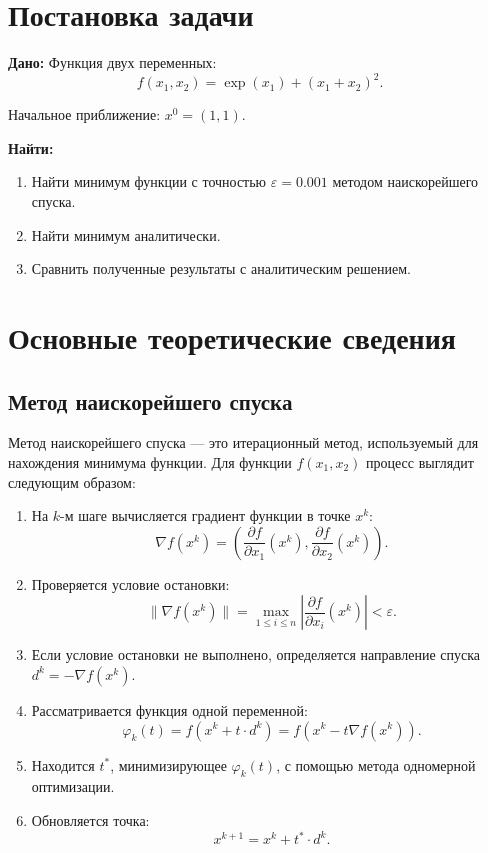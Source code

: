 \documentclass[a4paper, 14pt]{extarticle}
\begin{document}


\renewcommand{\ttdefault}{pcr}

\setlength{\tabcolsep}{3pt}



\newpage
\setcounter{page}{2}


\section{Постановка задачи}

\textbf{Дано:} Функция двух переменных:
\[ f(x_1, x_2) = \exp(x_1) + (x_1 + x_2)^2. \]

Начальное приближение: \( x^0 = (1, 1) \).

\textbf{Найти:}
\begin{enumerate}
    \item Найти минимум функции с точностью \( \varepsilon = 0.001 \) методом наискорейшего спуска.
    \item Найти минимум аналитически.
    \item Сравнить полученные результаты с аналитическим решением.
\end{enumerate}

\section{Основные теоретические сведения}

\subsection{Метод наискорейшего спуска}

Метод наискорейшего спуска — это итерационный метод, используемый для нахождения минимума функции. 
Для функции \( f(x_1, x_2) \) процесс выглядит следующим образом:

\begin{enumerate}
    \item На \( k \)-м шаге вычисляется градиент функции в точке \( x^k \):
    \[
    \nabla f(x^k) = \left( \frac{\partial f}{\partial x_1}(x^k), \frac{\partial f}{\partial x_2}(x^k) \right).
    \]
    \item Проверяется условие остановки:
    \[
    \|\nabla f(x^k)\| = \max_{1 \leq i \leq n} \left| \frac{\partial f}{\partial x_i}(x^k) \right| < \varepsilon.
    \]
    \item Если условие остановки не выполнено, определяется направление спуска \( d^k = -\nabla f(x^k) \).
    \item Рассматривается функция одной переменной:
    \[
    \varphi_k(t) = f(x^k + t \cdot d^k) = f(x^k - t \nabla f(x^k)).
    \]
    \item Находится \( t^* \), минимизирующее \( \varphi_k(t) \), с помощью метода одномерной оптимизации.
    \item Обновляется точка:
    \[
    x^{k+1} = x^k + t^* \cdot d^k.
    \]
\end{enumerate}
\end{document}
